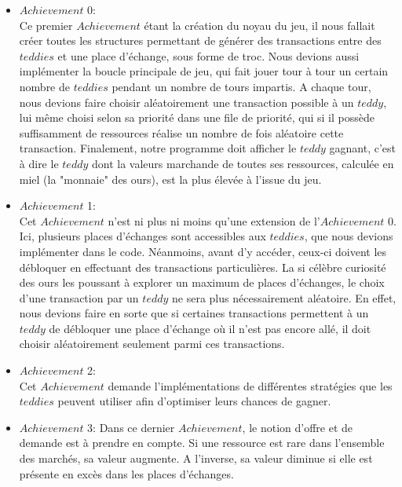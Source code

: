 \documentclass{article}
\begin{document}
     \begin{itemize}
        \item $Achievement$ 0: \\
    Ce premier $Achievement$ étant la création du noyau du jeu, il nous fallait créer toutes les structures permettant de générer des transactions entre des $teddies$ et une place d'échange, sous forme de troc. Nous devions aussi implémenter la boucle principale de jeu, qui fait jouer tour à tour un certain nombre de $teddies$ pendant un nombre de tours impartis. A chaque tour, nous devions faire choisir aléatoirement une transaction possible à un $teddy$, lui même choisi selon sa priorité dans une file de priorité, qui si il possède suffisamment de ressources réalise un nombre de fois aléatoire cette transaction. Finalement, notre programme doit afficher le $teddy$ gagnant, c'est à dire le $teddy$ dont la valeurs marchande de toutes ses ressources, calculée en miel (la "monnaie" des ours), est la plus élevée à l'issue du jeu.
        \item $Achievement$ 1: \\
    Cet $Achievement$ n'est ni plus ni moins qu'une extension de l'$Achievement$ 0. Ici, plusieurs places d'échanges sont accessibles aux $teddies$, que nous devions implémenter dans le code. Néanmoins, avant d'y accéder, ceux-ci doivent les débloquer en effectuant des transactions particulières. La si célèbre curiosité des ours les poussant à explorer un maximum de places d'échanges, le choix d'une transaction par un $teddy$ ne sera plus nécessairement aléatoire. En effet, nous devions faire en sorte que si certaines transactions permettent à un $teddy$ de débloquer une place d'échange où il n'est pas encore allé, il doit choisir aléatoirement seulement parmi ces transactions.
        \item $Achievement$ 2:\\
    Cet $Achievement$ demande l'implémentations de différentes stratégies que les $teddies$ peuvent utiliser afin d'optimiser leurs chances de gagner. 
        \item $Achievement$ 3:
    Dans ce dernier $Achievement$, le notion d'offre et de demande est à prendre en compte. Si une ressource est rare dans l'ensemble des marchés, sa valeur augmente. A l'inverse, sa valeur diminue si elle est présente en excès dans les places d'échanges. 
\end{itemize}
\end{document}
